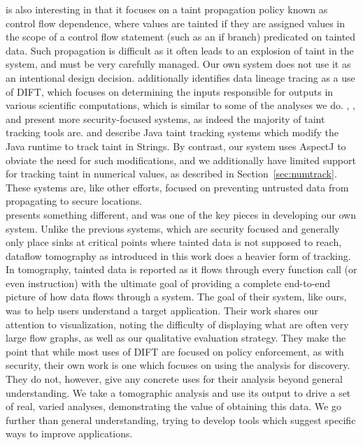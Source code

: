 \documentclass[msc,oneside]{ubcthesis}
\begin{document}
	\cite{Al-Saleh2010a} is also interesting in that it focuses on a taint propagation policy known as control flow dependence, where values are tainted if they are assigned values in the scope of a control flow statement (such as an if branch) predicated on tainted data. Such propagation is difficult as it often leads to an explosion of taint in the system, and must be very carefully managed. Our own system does not use it as an intentional design decision. \cite{Gupta2008} additionally identifies data lineage tracing as a use of DIFT, which focuses on determining the inputs responsible for outputs in various scientific computations, which is similar to some of the analyses we do. \cite{Dalton2010}, \cite{Zavou2011}, and \cite{Kangkook2012} present more security-focused systems, as indeed the majority of taint tracking tools are. \cite{Haldar2005} and \cite{Chin2009} describe Java taint tracking systems which modify the Java runtime to track taint in Strings. By contrast, our system uses AspectJ to obviate the need for such modifications, and we additionally have limited support for tracking taint in numerical values, as described in Section~\ref{sec:numtrack}. These systems are, like other efforts, focused on preventing untrusted data from propagating to secure locations.\\
	
	\cite{Mysore2008} presents something different, and was one of the key pieces in developing our own system. Unlike the previous systems, which are security focused and generally only place sinks at critical points where tainted data is not supposed to reach, dataflow tomography as introduced in this work does a heavier form of tracking. In tomography, tainted data is reported as it flows through every function call (or even instruction) with the ultimate goal of providing a complete end-to-end picture of how data flows through a system. The goal of their system, like ours, was to help users understand a target application. Their work shares our attention to visualization, noting the difficulty of displaying what are often very large flow graphs, as well as our qualitative evaluation strategy. They make the point that while most uses of DIFT are focused on policy enforcement, as with security, their own work is one which focuses on using the analysis for discovery. They do not, however, give any concrete uses for their analysis beyond general understanding. We take a tomographic analysis and use its output to drive a set of real, varied analyses, demonstrating the value of obtaining this data. We go further than general understanding, trying to develop tools which suggest specific ways to improve applications.
	
\end{document}
